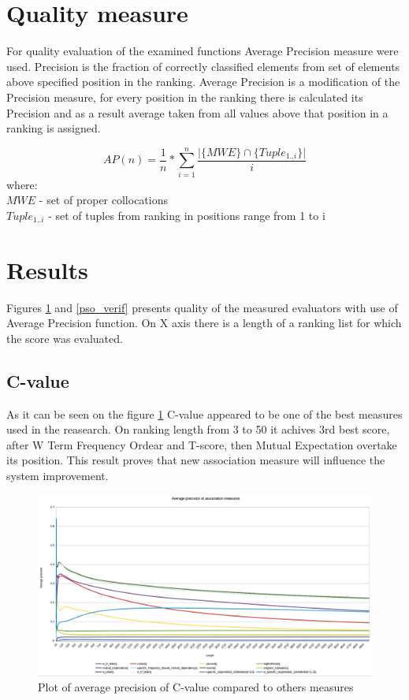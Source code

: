\section{Quality measure}\label{ap_desc}
For quality evaluation of the examined functions Average Precision measure were used.
Precision is the fraction of correctly classified elements from set of elements above specified position in the ranking. 
Average Precision is a modification of the Precision measure, for every position in the ranking there is calculated its 
Precision and as a result average taken from all values above that position in a ranking is assigned.

\[
    AP(n) = \frac{1}{n} * \sum_{i=1}^{n}{\frac{|\{MWE\} \cap \{Tuple_{1..i}\}|}{i}}
\]
where: \\
\(MWE\) - set of proper collocations \\
\(Tuple_{1..i}\) - set of tuples from ranking in positions range from 1 to i

\section{Results}
Figures \ref{cval_verif} and \ref{pso_verif} presents quality of the measured evaluators with use of Average Precision function. 
On X axis there is a length of a ranking list for which the score was evaluated.
\subsection{C-value}
As it can be seen on the figure \ref{cval_verif} C-value appeared to be one of the best measures used in the reasearch. 
On ranking length from 3 to 50 it achives 3rd best score, after W Term Frequency Ordear and T-score, then Mutual Expectation 
overtake its position. This result proves that new association measure will influence the system improvement.
\begin{figure}[ht]
    \centering
    \includegraphics[scale=0.32]{img/cval_verif.png}
    \caption{Plot of average precision of C-value compared to others measures}
    \label{cval_verif}
\end{figure}

